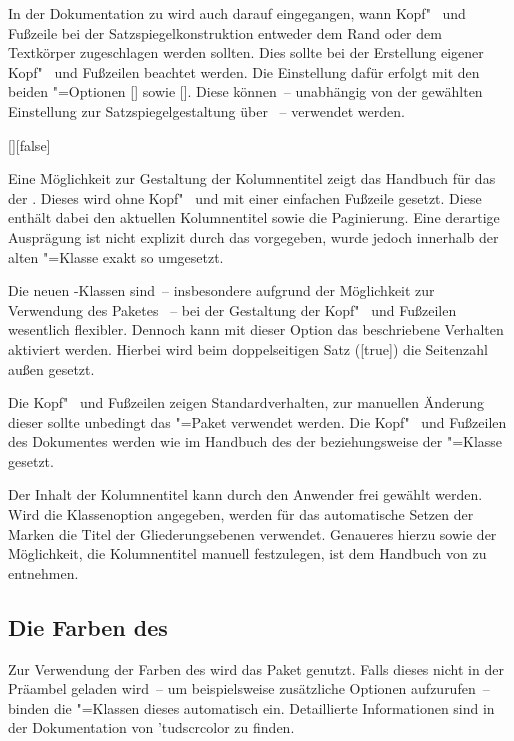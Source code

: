 In der Dokumentation zu  wird auch darauf eingegangen, wann 
Kopf"~ und Fußzeile bei der Satzspiegelkonstruktion entweder dem Rand oder dem 
Textkörper zugeschlagen werden sollten. Dies sollte bei der Erstellung eigener 
Kopf"~ und Fußzeilen beachtet werden. Die Einstellung dafür erfolgt mit den 
beiden \KOMAScript"=Optionen [\PBoolean] sowie 
[\PBoolean]. Diese können~-- unabhängig von der gewählten 
Einstellung zur Satzspiegelgestaltung über ~-- verwendet 
werden.

\begin{Declaration}{[\PBoolean]}[false]%
\printdeclarationlist%
%

Eine Möglichkeit zur Gestaltung der Kolumnentitel zeigt das Handbuch für das 
\CD der \TnUD. Dieses wird ohne Kopf"~ und mit einer einfachen Fußzeile 
gesetzt. Diese enthält dabei den aktuellen Kolumnentitel sowie die Paginierung. 
Eine derartige Ausprägung ist nicht explizit durch das \CD vorgegeben, wurde 
jedoch innerhalb der alten "=Klasse exakt so umgesetzt.

Die neuen \TUDScript-Klassen sind~-- insbesondere aufgrund der Möglichkeit zur 
Verwendung des Paketes ~-- bei der Gestaltung der 
Kopf"~ und Fußzeilen wesentlich flexibler. Dennoch kann mit dieser Option das 
beschriebene Verhalten aktiviert werden. Hierbei wird beim doppelseitigen Satz 
([true]) die Seitenzahl außen gesetzt.
%
\begin{values}
\itemfalse
  Die Kopf"~ und Fußzeilen zeigen Standardverhalten, zur manuellen Änderung 
  dieser sollte unbedingt das \KOMAScript"=Paket  
  verwendet werden.
\itemtrue*
  Die Kopf"~ und Fußzeilen des Dokumentes werden wie im Handbuch des \CDs der 
  \TnUD beziehungsweise der "=Klasse gesetzt.
\end{values}
%
Der Inhalt der Kolumnentitel kann durch den Anwender frei gewählt werden. Wird 
die Klassenoption  angegeben, werden für das automatische 
Setzen der Marken die Titel der Gliederungsebenen verwendet. Genaueres hierzu 
sowie der Möglichkeit, die Kolumnentitel manuell festzulegen, ist dem Handbuch 
von \KOMAScript{} zu entnehmen.
\end{Declaration}


\subsection{Die Farben des \CDs}
%
% 
Zur Verwendung der Farben des \CDs wird das Paket  
genutzt. Falls dieses nicht in der Präambel geladen wird~-- um beispielsweise 
zusätzliche Optionen aufzurufen~-- binden die \TUDScript"=Klassen dieses 
automatisch ein. Detaillierte Informationen sind in der Dokumentation von 
\Package'{tudscrcolor} zu finden.



